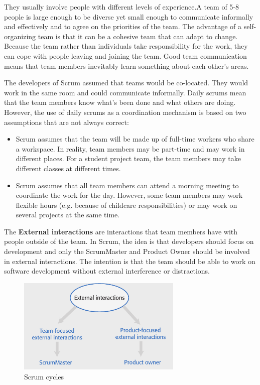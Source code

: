 \documentclass[10pt,a4paper]{report}
\begin{document}
They usually involve people with different levels of experience.A team of 5-8 people is large enough to be diverse yet small enough to communicate informally and effectively and to agree on the priorities of the
team.
The advantage of a self-organizing team is that it can be a cohesive team that can adapt to change.
Because the team rather than individuals take responsibility for the work, they can cope with people leaving and joining the team. Good team communication means that team members inevitably learn something about each other’s areas.

The developers of Scrum assumed that teams would be co-located. They would work in the same room and could communicate informally. Daily scrums mean that the team members know what’s been done and what
others are doing.
 However, the use of daily scrums as a coordination mechanism is based on two assumptions that are not always correct:
 \begin{itemize}
 	\item Scrum assumes that the team will be made up of full-time workers who share a
 	workspace. In reality, team members may be part-time and may work in
 	different places. For a student project team, the team members may take
 	different classes at different times.
 	
 	\item Scrum assumes that all team members can attend a morning meeting to
 	coordinate the work for the day. However, some team members may work
 	flexible hours (e.g. because of childcare responsibilities) or may work on several
 	projects at the same time.
 \end{itemize}
The \textbf{External interactions} are interactions that team members have with people outside of the team.
In Scrum, the idea is that developers should focus on development and only the ScrumMaster and Product Owner should be involved in external interactions. The intention is that the team should be able to work on software development without external interference or distractions.
\begin{figure}[h]
	\centering
	\includegraphics[width=0.7\textwidth]{image14}
	\caption{Scrum cycles}
	\label{image14}
\end{figure}
\end{document}
